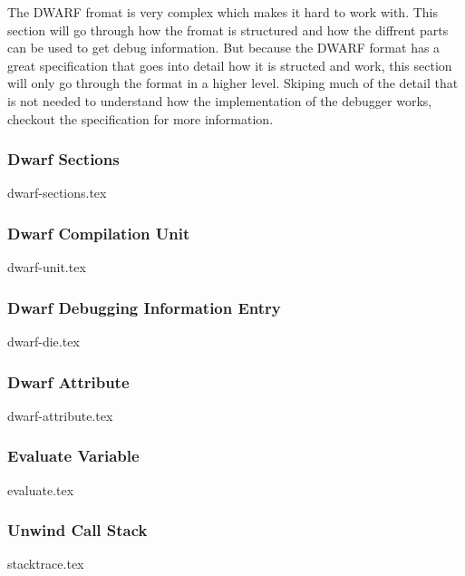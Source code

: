  


The \gls{DWARF} fromat is very complex which makes it hard to work with.
This section will go through how the fromat is structured and how the diffrent parts can be used to get debug information.
But because the \gls{DWARF} format has a great specification that goes into detail how it is structed and work, this section will only go through the format in a higher level.
Skiping much of the detail that is not needed to understand how the implementation of the debugger works, checkout the specification \cite{dwarf} for more information.


\subsubsection{Dwarf Sections}
{dwarf-sections.tex}


\subsubsection{Dwarf Compilation Unit}
{dwarf-unit.tex}


\subsubsection{Dwarf Debugging Information Entry}
{dwarf-die.tex}


\subsubsection{Dwarf Attribute}
{dwarf-attribute.tex}


\subsubsection{Evaluate Variable}
{evaluate.tex}


\subsubsection{Unwind Call Stack}
{stacktrace.tex}

